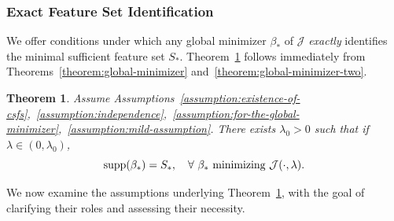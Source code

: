 \documentclass[sn-mathphys-num]{sn-jnl}%
\numberwithin{equation}{section}
\newcommand{\redblock}[1]{{\color{black}#1}}
\newcommand{\supp}{\mathop{\rm supp}}
\theoremstyle{thmstyleone}%
\newtheorem{theorem}{Theorem}%
\theoremstyle{thmstyletwo}%
\theoremstyle{thmstylethree}%
\begin{document}
\redblock{
\subsubsection{Exact Feature Set Identification} 
\label{sec:exact-feature-identification} 
\indent\indent
We offer conditions under which any global minimizer $\beta_*$ of $\mathcal{J}$ \emph{exactly} identifies the minimal sufficient feature set $S_*$. Theorem~\ref{theorem:global-minimizer-three} follows immediately from Theorems~\ref{theorem:global-minimizer} and~\ref{theorem:global-minimizer-two}.

\vspace{.5em} 
\begin{theorem}
\label{theorem:global-minimizer-three}
Assume Assumptions~\ref{assumption:existence-of-csfs},~\ref{assumption:independence},~\ref{assumption:for-the-global-minimizer},~\ref{assumption:mild-assumption}. 
There exists $\lambda_0 > 0$ such that if $\lambda \in (0, \lambda_0)$, 
\begin{equation*}
	\supp(\beta_*) = S_*,~~~\forall~\beta_*~\text{minimizing}~\mathcal{J}(\cdot, \lambda). 
\end{equation*}
\end{theorem} 


We now examine the assumptions underlying Theorem~\ref{theorem:global-minimizer-three}, with the goal of clarifying their roles and assessing their necessity.

}
\end{document}
